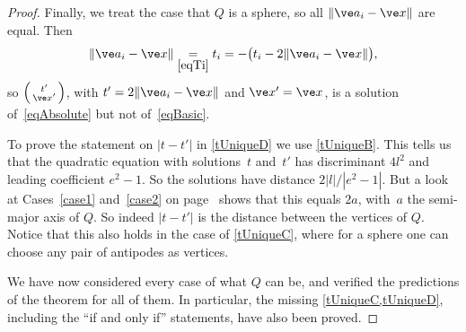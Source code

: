 \documentclass[reqno]{amsart}
\begin{document}
\begin{proof}
  Finally, we treat the case that $Q$ is a sphere, so all
  $\lVert\ve a_i - \ve x\rVert$ are equal. Then
  \[
    \lVert\ve a_i - \ve x\rVert \underset{\eqref{eqTi}}{=} t_i = -
    \bigl(t_i - 2 \lVert\ve a_i - \ve x\rVert\bigr),
  \]
  so $\left(\begin{smallmatrix} t' \\ \ve x'\end{smallmatrix}\right)$,
  with $t' = 2 \lVert\ve a_i - \ve x\rVert$ and $\ve x' = \ve x$, is a
  solution of~\eqref{eqAbsolute} but not of~\eqref{eqBasic}.

  To prove the statement on $|t - t'|$ in \cref{tUniqueD} we use
  \cref{tUniqueB}. This tells us that the quadratic equation with
  solutions~$t$ and~$t'$ has discriminant $4 l^2$ and leading
  coefficient $e^2 - 1$. So the solutions have distance
  $2 |l|/|e^2 - 1|$. But a look at Cases~\ref{case1} and~\ref{case2}
  on page~\pageref{case1} shows that this equals $2 a$, with~$a$ the
  semi-major axis of $Q$. So indeed $|t - t'|$ is the distance between
  the vertices of $Q$. Notice that this also holds in the case of
  \cref{tUniqueC}, where for a sphere one can choose any pair of
  antipodes as vertices.

  We have now considered every case of what $Q$ can be, and verified
  the predictions of the theorem for all of them. In particular, the
  missing \cref{tUniqueC,tUniqueD}, including the ``if and only if''
  statements, have also been proved.
\end{proof}
\end{document}
